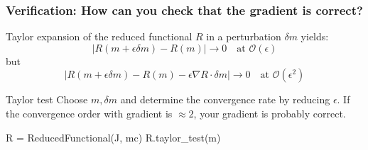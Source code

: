 


\begin{frame}[fragile]
  \frametitle{Verification: How can you check that the gradient is correct?}
  \vspace{1em}
  Taylor expansion of the reduced functional $R$ in a
  perturbation $\delta m$ yields:
  \begin{equation*}
    |R(m + \epsilon \delta m) - R(m)| \to 0 \quad \textrm{at } \mathcal O(\epsilon)
  \end{equation*}
  but
  \begin{equation*}
    |R(m + \epsilon \delta m) - R(m) - \epsilon \nabla R \cdot \delta m| \to 0 \quad \textrm{at } \mathcal O(\epsilon^2)
    \label{eqn:taylor_test_gradient}
  \end{equation*}
  \begin{block}{Taylor test}
    Choose $m, \delta m$ and determine the convergence rate by reducing
    $\epsilon$. If the convergence order with gradient is $\approx 2$,
    your gradient is probably correct.
  \end{block}
  \vspace{-1em}
  \begin{python}
    R = ReducedFunctional(J, mc)
    R.taylor_test(m)
  \end{python}
\end{frame}


